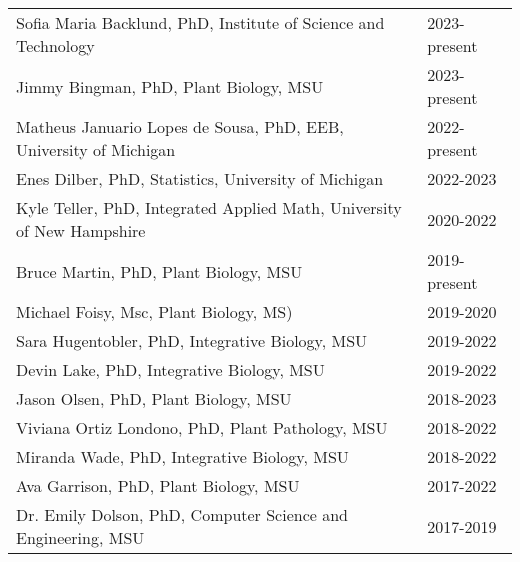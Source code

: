\documentclass{article}
\begin{document}
\begin{longtable}{>{\everypar{\hangindent1cm}}p{}p{}}
\rule{0pt}{3ex}Sofia Maria Backlund, \hspace{0.25cm}PhD, Institute of Science and Technology &\hfill 2023-present\\
Jimmy Bingman, \hspace{0.25cm}PhD, Plant Biology, MSU &\hfill 2023-present\\
Matheus Januario Lopes de Sousa, \hspace{0.25cm}PhD, EEB, University of Michigan &\hfill 2022-present\\
Enes Dilber, \hspace{0.25cm}PhD, Statistics, University of Michigan &\hfill 2022-2023\\
Kyle Teller, \hspace{0.25cm}PhD, Integrated Applied Math, University of New Hampshire &\hfill 2020-2022\\
Bruce Martin, \hspace{0.25cm}PhD, Plant Biology, MSU &\hfill 2019-present\\
Michael Foisy, \hspace{0.25cm}Msc, Plant Biology, MS) &\hfill 2019-2020\\
Sara Hugentobler, \hspace{0.25cm}PhD, Integrative Biology, MSU &\hfill 2019-2022\\
Devin Lake, \hspace{0.25cm}PhD, Integrative Biology, MSU &\hfill 2019-2022\\
Jason Olsen, \hspace{0.25cm}PhD, Plant Biology, MSU &\hfill 2018-2023\\
Viviana Ortiz Londono, \hspace{0.25cm}PhD, Plant Pathology, MSU &\hfill 2018-2022\\
Miranda Wade, \hspace{0.25cm}PhD, Integrative Biology, MSU &\hfill 2018-2022\\
Ava Garrison, \hspace{0.25cm}PhD, Plant Biology, MSU &\hfill 2017-2022\\
Dr. Emily Dolson, \hspace{0.25cm}PhD, Computer Science and Engineering, MSU &\hfill 2017-2019

%
\end{longtable}
%
\vspace{-1cm}
\end{document}
